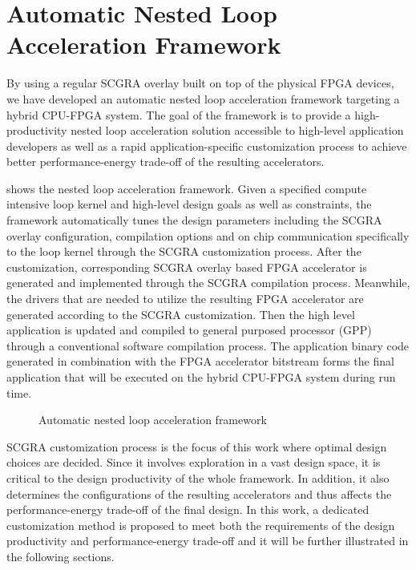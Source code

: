 \section{Automatic Nested Loop Acceleration Framework} \label{sec:acc-framework}
By using a regular SCGRA overlay built on top of the physical FPGA devices, 
we have developed an automatic nested loop acceleration framework targeting 
a hybrid CPU-FPGA system. The goal of the framework is to provide a 
high-productivity nested loop acceleration solution accessible to high-level 
application developers as well as a rapid application-specific 
customization process to achieve better performance-energy trade-off of 
the resulting accelerators. 

 shows the nested loop acceleration framework. Given 
a specified compute intensive loop kernel and high-level design 
goals as well as constraints, the framework automatically 
tunes the design parameters including the SCGRA overlay 
configuration, compilation options and on chip 
communication specifically to the loop kernel through the SCGRA customization 
process. After the customization, corresponding SCGRA overlay based 
FPGA accelerator is generated and implemented through the SCGRA compilation process. 
Meanwhile, the drivers that are needed to utilize the resulting FPGA accelerator 
are generated according to the SCGRA customization. Then the high level application 
is updated and compiled to general purposed processor (GPP) through a 
conventional software compilation process. The application binary code generated in 
combination with the FPGA accelerator bitstream forms the final application 
that will be executed on the hybrid CPU-FPGA system during run time.

\begin{figure}[tb]
\caption{Automatic nested loop acceleration framework}
\label{fig:framework}
\end{figure} 

SCGRA customization process is the focus of this work where optimal 
design choices are decided. Since it involves exploration in a vast 
design space, it is critical to the design productivity of the whole 
framework. In addition, it also determines the configurations of 
the resulting accelerators and thus affects the performance-energy 
trade-off of the final design. In this work, a dedicated customization 
method is proposed to meet both the requirements of the design productivity and 
performance-energy trade-off and it will be further illustrated in the following 
sections.

